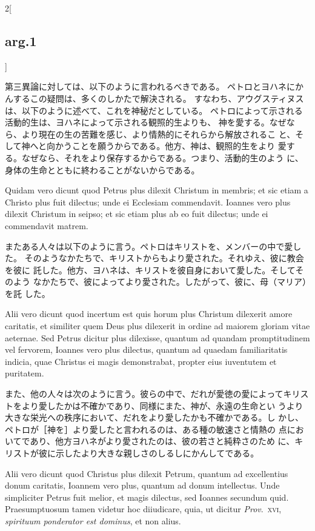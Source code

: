 \documentclass[paper=a4paper,fontsize=10pt,jafontsize=9pt,titlepage]{jlreq}
\begin{document}
\begin{paracol}{2}[\subsection{arg.1}]
\switchcolumn

第三異論に対しては、以下のように言われるべきである。
ペトロとヨハネにかんするこの疑問は、多くのしかたで解決される。
すなわち、アウグスティヌスは、以下のように述べて、これを神秘だとしている。
ペトロによって示される活動的生は、ヨハネによって示される観照的生よりも、
 神を愛する。なぜなら、より現在の生の苦難を感じ、より情熱的にそれらから解放されるこ
 と、そして神へと向かうことを願うからである。他方、神は、観照的生をより
 愛する。なぜなら、それをより保存するからである。つまり、活動的生のよう
 に、身体の生命とともに終わることがないからである。

\switchcolumn*


Quidam vero dicunt quod Petrus plus dilexit Christum
 in membris; et sic etiam a Christo plus fuit dilectus; unde ei
 Ecclesiam commendavit. Ioannes vero plus dilexit Christum in seipso; et
 sic etiam plus ab eo fuit dilectus; unde ei commendavit matrem.

\switchcolumn

またある人々は以下のように言う。ペトロはキリストを、メンバーの中で愛した。
そのようなかたちで、キリストからもより愛された。それゆえ、彼に教会を彼に
 託した。他方、ヨハネは、キリストを彼自身において愛した。そしてそのよう
 なかたちで、彼によってより愛された。したがって、彼に、母（マリア）を託
 した。

\switchcolumn*


Alii
 vero dicunt quod incertum est quis horum plus Christum dilexerit amore
 caritatis, et similiter quem Deus plus dilexerit in ordine ad maiorem
 gloriam vitae aeternae. Sed Petrus dicitur plus dilexisse, quantum ad
 quandam promptitudinem vel fervorem, Ioannes vero plus dilectus,
 quantum ad quaedam familiaritatis indicia, quae Christus ei magis
 demonstrabat, propter eius iuventutem et puritatem.

\switchcolumn

また、他の人々は次のように言う。彼らの中で、だれが愛徳の愛によってキリス
 トをより愛したかは不確かであり、同様にまた、神が、永遠の生命とい
 うより大きな栄光への秩序において、だれをより愛したかも不確かである。し
 かし、ペトロが［神を］より愛したと言われるのは、ある種の敏速さと情熱の
 点においてであり、他方ヨハネがより愛されたのは、彼の若さと純粋さのため
 に、キリストが彼に示したより大きな親しさのしるしにかんしてである。

\switchcolumn*


Alii vero dicunt
 quod Christus plus dilexit Petrum, quantum ad excellentius donum
 caritatis, Ioannem vero plus, quantum ad donum intellectus. Unde
 simpliciter Petrus fuit melior, et magis dilectus, sed Ioannes secundum
 quid. Praesumptuosum tamen videtur hoc diiudicare, quia, ut dicitur
 {\itshape Prov}.~{\scshape xvi}, {\itshape spirituum ponderator est dominus}, et non alius.


\end{paracol}
\end{document}

